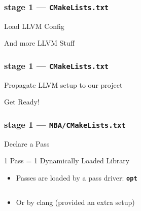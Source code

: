 \documentclass[14pt]{beamer}
\begin{document}
    \begin{frame}[containsverbatim]
        \frametitle{stage 1 --- \texttt{CMakeLists.txt}}
        \begin{block}{Load LLVM Config}
            \footnotesize
            
        \end{block}
        \begin{block}{And more LLVM Stuff}
            \footnotesize
            
        \end{block}
    \end{frame}

    \begin{frame}[containsverbatim]
        \frametitle{stage 1 --- \texttt{CMakeLists.txt}}
        \begin{block}{Propagate LLVM setup to our project}
            \footnotesize
            
        \end{block}

        \begin{block}{Get Ready!}
            \footnotesize
            
        \end{block}
    \end{frame}

    \begin{frame}[containsverbatim]
        \frametitle{stage 1 --- \texttt{MBA/CMakeLists.txt}}
        \begin{block}{Declare a Pass}
            \footnotesize
            
        \end{block}

        \begin{alertblock}{1 Pass = 1 Dynamically Loaded Library}
            \begin{itemize}
                \item Passes are loaded by a pass driver: \textbf{\texttt{opt}}
{
\footnotesize
\begin{lstlisting}[language=bash]
% opt -load LLVMMBA.so -mba input.ll -S
\end{lstlisting}
}
                \item Or by clang (provided an extra setup)
{
\footnotesize
\begin{lstlisting}[language=bash]
% clang -Xclang -load -Xclang LLVMMBA.so input.c -c
\end{lstlisting}
}
            \end{itemize}
        \end{alertblock}

    \end{frame}
\end{document}
